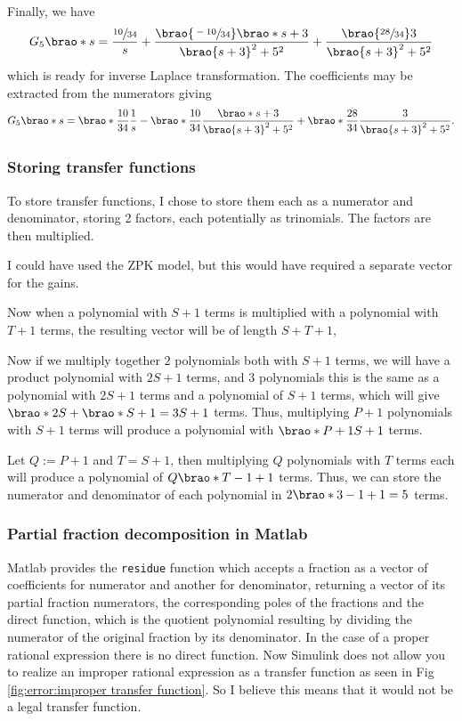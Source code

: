 \documentclass[12pt]{article}
\DeclarePairedDelimiter\brao()%
\begin{document}
Finally, we have 
\begin{equation}
    G_5\brao*s = \frac{\sfrac{10}{34}}s + \frac{\brao{\sfrac{-10}{34}}\brao*{s + 3}}{\brao{s + 3}^2 + 5^2}  + \frac{\brao{\sfrac{28}{34}}3}{\brao{s + 3}^2 + 5^2}
\end{equation}
which is ready for inverse Laplace transformation.
The coefficients may be extracted from the numerators giving
\begin{equation}
    G_5\brao*s = \brao*{\frac{10}{34}}\frac1s - \brao*{\frac{10}{34}}\frac{\brao*{s + 3}}{\brao{s + 3}^2 + 5^2}  + \brao*{\frac{28}{34}}\frac{3}{\brao{s + 3}^2 + 5^2}.
\end{equation}


\subsubsection{Storing transfer functions}

To store transfer functions,
I chose to store them each as a numerator and denominator, storing 2 factors, each potentially as trinomials.
The factors are then multiplied.

I could have used the ZPK model, but this would have required a separate vector for the gains.

Now when a polynomial with $S + 1$ terms is multiplied with a polynomial with $T + 1$ terms, the resulting vector will be of length $S + T + 1$,

Now if we multiply together $2$ polynomials both with $S + 1$ terms,
we will have a product polynomial with $2S + 1$ terms,
and $3$ polynomials this is the same as a polynomial with $2S + 1$ terms and a polynomial of $S + 1$ terms, which
will give $\brao*{2S} + \brao*{S} + 1 = 3S + 1$ terms.
Thus, multiplying $P + 1$ polynomials with $S + 1$ terms will produce a polynomial with $\brao*{P + 1}S + 1$ terms.

Let $Q := P + 1$ and $T = S + 1$, then multiplying $Q$ polynomials with $T$ terms each will produce a polynomial of $Q\brao*{T - 1} + 1$ terms. Thus, we can store the numerator and denominator of each polynomial in $2\brao*{3 - 1} + 1 = 5$ terms.

\subsubsection{Partial fraction decomposition in Matlab}

Matlab provides the \texttt{residue} function which accepts a fraction as a vector of coefficients for numerator and another for denominator,
returning a vector of its partial fraction numerators, the corresponding poles of the fractions and the direct function,
which is the quotient polynomial resulting by dividing the numerator of the original fraction by its denominator.
In the case of a proper rational expression there is no direct function.
Now Simulink does not allow you to realize an improper rational expression as a transfer function as seen in Fig \ref{fig:error:improper transfer function}.
So I believe this means that it would not be a legal transfer function.
\end{document}
